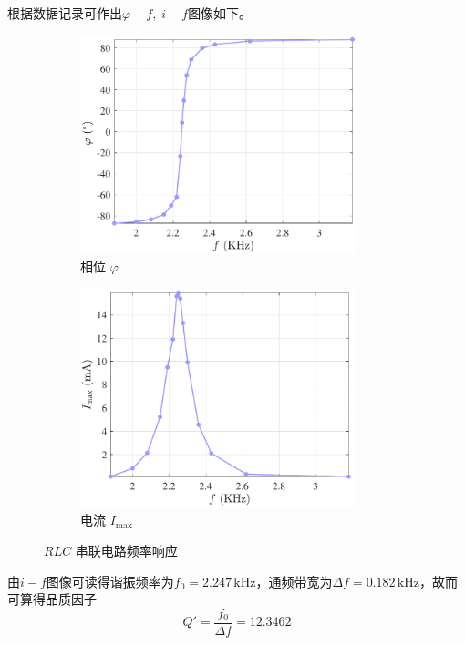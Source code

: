\documentclass[UTF8]{article}
\theoremstyle{MyLineTheoremStyle} %
\theoremstyle{MyBlockTheoremStyle} %
\theoremstyle{MySubsubsectionStyle} %
\begin{document}
根据数据记录可作出$ \varphi-f,\;i-f $图像如下。

\begin{figure}[H]\centering
\begin{subfigure}[b]{0.5\columnwidth}\centering
    \includegraphics[height=180pt]{assets/1/2024-12-24_22-29-46.pdf}
    \caption{相位 $\varphi$}
\end{subfigure}\hfill
\begin{subfigure}[b]{0.5\columnwidth}\centering
    \includegraphics[height=180pt]{assets/1/2024-12-24_22-29-49.pdf}
    \caption{电流 $I_{\max}$}
\end{subfigure}
\caption{$RLC$ 串联电路频率响应}
\end{figure}
由$ i-f $图像可读得谐振频率为$ f_0=2.247\,\mathrm{kHz} $，通频带宽为$ \Delta f = 0.182\,\mathrm{kHz} $，故而可算得品质因子
\begin{equation}
Q'=\frac{f_0}{\Delta f} = 12.3462
\end{equation}
\end{document}
